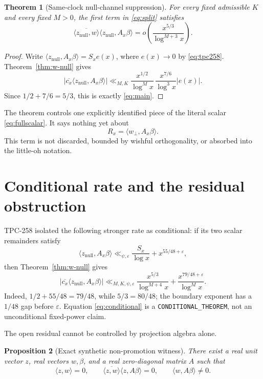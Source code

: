 \documentclass[10pt]{article}
\newtheorem{theorem}{Theorem}
\newtheorem{proposition}[theorem]{Proposition}
\newcommand{\ip}[2]{\langle #1,#2\rangle}
\newcommand{\Ax}{A_x}
\newcommand{\e}{\varepsilon}
\newcommand{\znull}{z_{\mathrm{null}}}
\newcommand{\wperp}{w_{\perp}}
\begin{document}
\begin{theorem}[Same-clock null-channel suppression]\label{thm:channel}
For every fixed admissible \(K\) and every fixed \(M>0\), the first term in
\eqref{eq:split} satisfies
\begin{equation}
 \boxed{\displaystyle
 \overline{\ip{\znull}{w}}\ip{\znull}{\Ax\beta}
 =o\!\left(\frac{x^{5/3}}{\log^{M+3}x}\right).}       \label{eq:main}
\end{equation}
\end{theorem}

\begin{proof}
Write \(\ip{\znull}{\Ax\beta}=S_xe(x)\), where \(e(x)\to0\) by
\eqref{eq:tpc258}.  Theorem~\ref{thm:w-null} gives
\[
 \left|\overline{c_x}\ip{\znull}{\Ax\beta}\right|
 \ll_{M,K}\frac{x^{1/2}}{\log^Mx}\,
              \frac{x^{7/6}}{\log^3x}|e(x)|.
\]
Since \(1/2+7/6=5/3\), this is exactly \eqref{eq:main}.
\end{proof}

The theorem controls one explicitly identified piece of the literal scalar
\eqref{eq:fullscalar}.  It says nothing yet about
\begin{equation}
 R_x=\ip{\wperp}{\Ax\beta}.                            \label{eq:residual}
\end{equation}
This term is not discarded, bounded by wishful orthogonality, or absorbed
into the little-oh notation.

\section{Conditional rate and the residual obstruction}

TPC-258 isolated the following stronger rate as conditional: if its two
scalar remainders satisfy
\[
 \ip{\znull}{\Ax\beta}
 \ll_{\psi,\e}\frac{S_x}{\log x}+x^{55/48+\e},
\]
then Theorem~\ref{thm:w-null} gives
\begin{equation}
 |\overline{c_x}\ip{\znull}{\Ax\beta}|
 \ll_{M,K,\psi,\e}
 \frac{x^{5/3}}{\log^{M+4}x}
 +\frac{x^{79/48+\e}}{\log^Mx}.                       \label{eq:conditional}
\end{equation}
Indeed, \(1/2+55/48=79/48\), while \(5/3=80/48\); the boundary exponent
has a \(1/48\) gap before \(\e\).  Equation \eqref{eq:conditional} is a
\texttt{CONDITIONAL\_THEOREM}, not an unconditional fixed-power claim.

The open residual cannot be controlled by projection algebra alone.

\begin{proposition}[Exact synthetic non-promotion witness]\label{prop:witness}
There exist a real unit vector \(z\), real vectors \(w,\beta\), and a real
zero-diagonal matrix \(A\) such that
\[
 \ip{z}{w}=0,\qquad
 \overline{\ip{z}{w}}\ip{z}{A\beta}=0,\qquad
 \ip{w}{A\beta}\ne0.
\]
\end{proposition}
\end{document}
